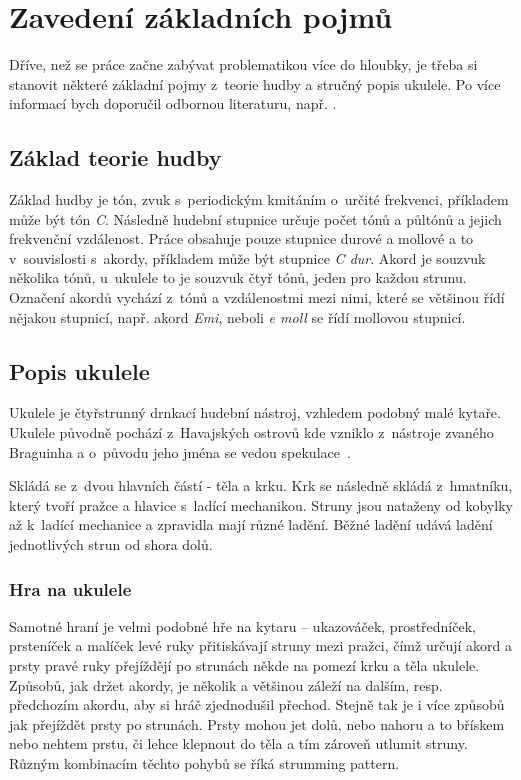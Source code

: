 \chapter{Zavedení základních pojmů}
\label{ch:glosary}
Dříve, než se práce začne zabývat problematikou více do hloubky, je třeba si stanovit některé základní pojmy z~teorie hudby a stručný popis ukulele. Po více informací bych doporučil odbornou literaturu, např. \cite[Hudební slovník pro každého]{jirivyslouzil_1995_hudebni}.

\section{Základ teorie hudby}
Základ hudby je tón, zvuk s~periodickým kmitáním o~určité frekvenci, příkladem může být tón \emph{C}. Následně hudební stupnice určuje počet tónů a půltónů a jejich frekvenční vzdálenost. Práce obsahuje pouze stupnice durové a mollové a to v~souvislosti s~akordy, příkladem může být stupnice \emph{C dur}. Akord je souzvuk několika tónů, u~ukulele to je souzvuk čtyř tónů, jeden pro každou strunu. Označení akordů vychází z~tónů a vzdálenostmi mezi nimi, které se většinou řídí nějakou stupnicí, např. akord \emph{Emi}, neboli \emph{e moll} se řídí mollovou stupnicí.

\section{Popis ukulele}
\label{sc:ukulele_description}
Ukulele je čtyřstrunný drnkací hudební nástroj, vzhledem podobný malé kytaře. Ukulele původně pochází z~Havajských ostrovů kde vzniklo z~nástroje zvaného Braguinha a o~původu jeho jména se vedou spekulace~\cite{rek_2008_kola}.

Skládá se z~dvou hlavních částí - těla a krku. Krk se následně skládá z~hmatníku, který tvoří pražce a hlavice s~ladící mechanikou. Struny jsou nataženy od kobylky až k~ladící mechanice a zpravidla mají různé ladění. Běžné ladění udává ladění jednotlivých strun od shora dolů.

\subsection{Hra na ukulele}
Samotné hraní je velmi podobné hře na kytaru –⁠ ukazováček, prostředníček, prsteníček a malíček levé ruky přitiskávají struny mezi pražci, čímž určují akord a prsty pravé ruky přejíždějí po strunách někde na pomezí krku a těla ukulele. Způsobů, jak držet akordy, je několik a většinou záleží na dalším, resp. předchozím akordu, aby si hráč zjednodušil přechod. Stejně tak je i více způsobů jak přejíždět prsty po strunách. Prsty mohou jet dolů, nebo nahoru a to břískem nebo nehtem prstu, či lehce klepnout do těla a tím zároveň utlumit struny. Různým kombinacím těchto pohybů se říká strumming pattern.

